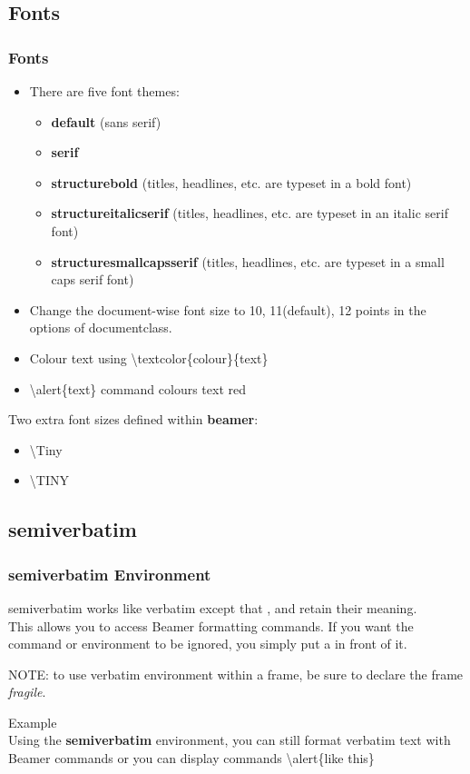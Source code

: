 \documentclass[11pt,pdf,aspectratio=43]{beamer}
\begin{document}
\subsection*{Fonts}
\begin{frame}
    \frametitle{Fonts}
    \begin{itemize}
	\item There are five font themes:
	    \begin{itemize}
		\item \textbf{default} (sans serif)
		\item \textbf{serif}
		\item \textbf{structurebold} (titles, headlines, etc. are typeset in a bold font)
		\item \textbf{structureitalicserif} (titles, headlines, etc. are typeset in an italic serif font)
		\item \textbf{structuresmallcapsserif} (titles, headlines, etc. are typeset in a small caps serif font)
	    \end{itemize}
	\item Change the document-wise font size to 10, 11(default), 12 points in the options of documentclass.
	\item Colour text using \textbackslash{}textcolor\{colour\}\{text\}
	\item \textbackslash{}alert\{text\} command colours text red
    \end{itemize}

    Two extra font sizes defined within {\bf beamer}:
    \begin{itemize}
	\item \textbackslash{Tiny}
	\item \textbackslash{TINY}
    \end{itemize}
\end{frame}

\subsection*{semiverbatim}
\begin{frame}
    \frametitle{semiverbatim Environment}
    semiverbatim works like verbatim except that \fbox{\textbackslash}, \fbox{\{} and \fbox{\}} retain their meaning. \\
    This allows you to access Beamer formatting commands. If you want the command or environment to be
    ignored, you simply put a \fbox{\textbackslash} in front of it.

    NOTE: to use verbatim environment within a frame, be sure to declare the frame \emph{fragile}.

    \color{brown}   Example \\
    Using the \textbf{semiverbatim} environment, you can still \alert{format} verbatim text with Beamer
    commands or you can display commands \textbackslash{}alert\{like this\}
\end{frame}
\end{document}
